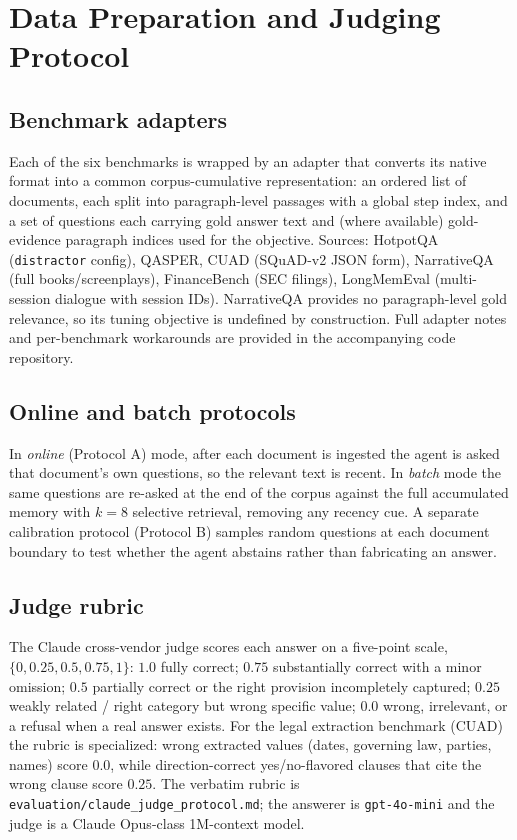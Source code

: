 \chapter{Data Preparation and Judging Protocol}
\label{app:data}

\section{Benchmark adapters}
Each of the six benchmarks is wrapped by an adapter that converts its native
format into a common corpus-cumulative representation: an ordered list of
documents, each split into paragraph-level passages with a global step index, and
a set of questions each carrying gold answer text and (where available)
gold-evidence paragraph indices used for the \recallk{} objective. Sources:
HotpotQA (\texttt{distractor} config), QASPER, CUAD (SQuAD-v2 JSON form),
NarrativeQA (full books/screenplays), FinanceBench (SEC filings), LongMemEval
(multi-session dialogue with session IDs). NarrativeQA provides no
paragraph-level gold relevance, so its \recallk{} tuning objective is undefined
by construction. Full adapter notes and per-benchmark workarounds are provided in
the accompanying code repository.

\section{Online and batch protocols}
In \emph{online} (Protocol A) mode, after each document is ingested the agent is
asked that document's own questions, so the relevant text is recent. In
\emph{batch} mode the same questions are re-asked at the end of the corpus
against the full accumulated memory with $k{=}8$ selective retrieval, removing any
recency cue. A separate calibration protocol (Protocol B) samples random
questions at each document boundary to test whether the agent abstains rather
than fabricating an answer.

\section{Judge rubric}
The Claude cross-vendor judge scores each answer on a five-point scale,
$\{0,0.25,0.5,0.75,1\}$: $1.0$ fully correct; $0.75$ substantially correct with a
minor omission; $0.5$ partially correct or the right provision incompletely
captured; $0.25$ weakly related / right category but wrong specific value; $0.0$
wrong, irrelevant, or a refusal when a real answer exists. For the legal
extraction benchmark (CUAD) the rubric is specialized: wrong extracted values
(dates, governing law, parties, names) score $0.0$, while direction-correct
yes/no-flavored clauses that cite the wrong clause score $0.25$. The verbatim
rubric is \texttt{evaluation/claude\_judge\_protocol.md}; the answerer is
\texttt{gpt-4o-mini} and the judge is a Claude Opus-class 1M-context model.
